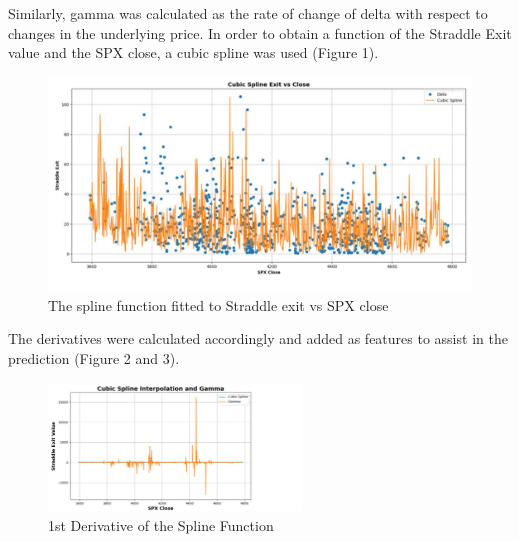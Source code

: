\documentclass[11pt]{article}
\begin{document}
Similarly, gamma was calculated as the rate of change of delta with respect to changes in the underlying price. In order to obtain a function of the Straddle Exit value and the SPX close, a cubic spline was used (Figure 1).




\begin{figure}[!t]
    \centering
    \includegraphics[width=\textwidth]{pic1.jpg} %
    \caption{The spline function fitted to Straddle exit vs SPX close}
\end{figure}


The derivatives were calculated accordingly and added as features to assist in the prediction (Figure 2 and 3).




\begin{figure}[H]
    \centering
    \includegraphics[width=0.6\textwidth]{pic2.jpg} %
    \caption{1st Derivative of the Spline Function}
    \label{fig:example}
\end{figure}
\end{document}
